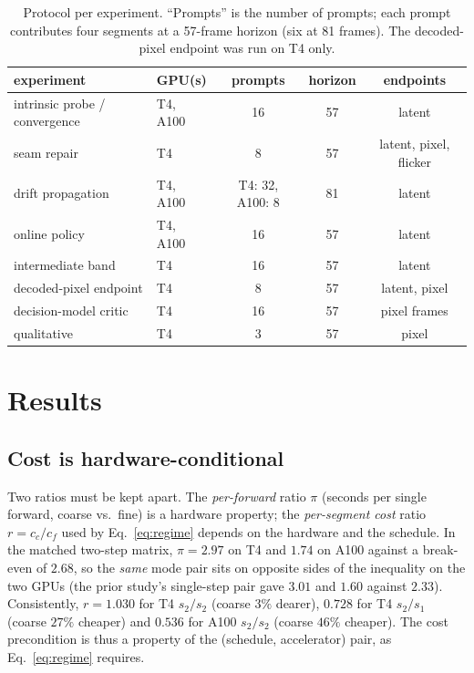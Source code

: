 \documentclass[review]{cas-sc}          %
\begin{document}
\begin{table}
  \centering
  \caption{Protocol per experiment. ``Prompts'' is the number of prompts; each prompt contributes four
  segments at a 57-frame horizon (six at 81 frames). The decoded-pixel endpoint was run on T4 only.}
  \label{tab:protocol}
  \begin{tabular}{llccc}
    \toprule
    experiment & GPU(s) & prompts & horizon & endpoints \\
    \midrule
    intrinsic probe / convergence & T4, A100 & 16 & 57 & latent \\
    seam repair                  & T4       & 8  & 57 & latent, pixel, flicker \\
    drift propagation            & T4, A100 & T4: 32, A100: 8 & 81 & latent \\
    online policy                & T4, A100 & 16 & 57 & latent \\
    intermediate band            & T4       & 16 & 57 & latent \\
    decoded-pixel endpoint       & T4       & 8  & 57 & latent, pixel \\
    decision-model critic        & T4       & 16 & 57 & pixel frames \\
    qualitative                  & T4       & 3  & 57 & pixel \\
    \bottomrule
  \end{tabular}
\end{table}

\section{Results}
\label{sec:results}

\subsection{Cost is hardware-conditional}
Two ratios must be kept apart. The \emph{per-forward} ratio $\pi$ (seconds per single forward, coarse vs.\
fine) is a hardware property; the \emph{per-segment cost} ratio $r = c_c/c_f$ used by
Eq.~\eqref{eq:regime} depends on the hardware and the schedule. In the matched two-step matrix,
$\pi = 2.97$ on T4 and $1.74$ on A100 against a break-even of $2.68$, so the \emph{same} mode pair sits on
opposite sides of the inequality on the two GPUs (the prior study's single-step pair gave $3.01$ and
$1.60$ against $2.33$). Consistently, $r = 1.030$ for T4 $s_2/s_2$ (coarse $3\%$ dearer), $0.728$ for
T4 $s_2/s_1$ (coarse $27\%$ cheaper) and $0.536$ for A100 $s_2/s_2$ (coarse $46\%$ cheaper). The cost
precondition is thus a property of the (schedule, accelerator) pair, as Eq.~\eqref{eq:regime} requires.
\end{document}
